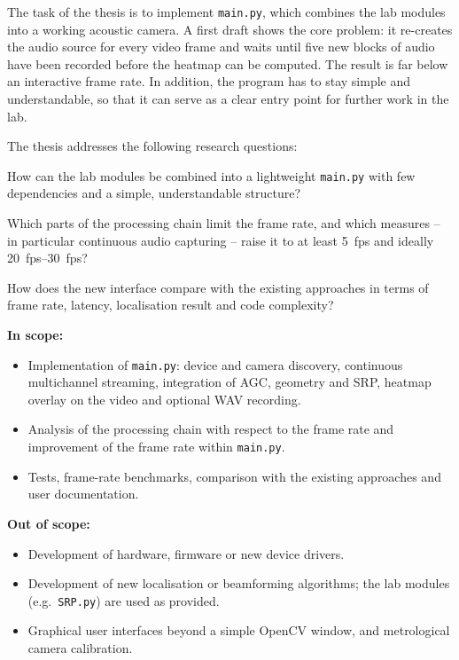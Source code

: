 \documentclass[11pt,a4paper]{article}
\newcommand{\code}[1]{\texttt{#1}}
\begin{document}
The task of the thesis is to implement \code{main.py}, which combines the lab
modules into a working acoustic camera. A first draft shows the core problem:
it re-creates the audio source for every video frame and waits until five new
blocks of audio have been recorded before the heatmap can be computed. The
result is far below an interactive frame rate. In addition, the program has to
stay simple and understandable, so that it can serve as a clear entry point
for further work in the lab.

The thesis addresses the following research questions:

\begin{description}[leftmargin=3.2em,labelwidth=2.8em,font=\bfseries]
  \item[RQ1:] How can the lab modules be combined into a lightweight
        \code{main.py} with few dependencies and a simple, understandable
        structure?
  \item[RQ2:] Which parts of the processing chain limit the frame rate, and
        which measures -- in particular continuous audio capturing -- raise
        it to at least \SI{5}{fps} and ideally \SIrange{20}{30}{fps}?
  \item[RQ3:] How does the new interface compare with the existing approaches
        in terms of frame rate, latency, localisation result and code
        complexity?
\end{description}

\textbf{In scope:}
\begin{itemize}
  \item Implementation of \code{main.py}: device and camera discovery,
        continuous multichannel streaming, integration of AGC, geometry and
        SRP, heatmap overlay on the video and optional WAV recording.
  \item Analysis of the processing chain with respect to the frame rate and
        improvement of the frame rate within \code{main.py}.
  \item Tests, frame-rate benchmarks, comparison with the existing approaches
        and user documentation.
\end{itemize}

\textbf{Out of scope:}
\begin{itemize}
  \item Development of hardware, firmware or new device drivers.
  \item Development of new localisation or beamforming algorithms; the lab
        modules (e.g.\ \code{SRP.py}) are used as provided.
  \item Graphical user interfaces beyond a simple OpenCV window, and
        metrological camera calibration.
\end{itemize}
\end{document}

